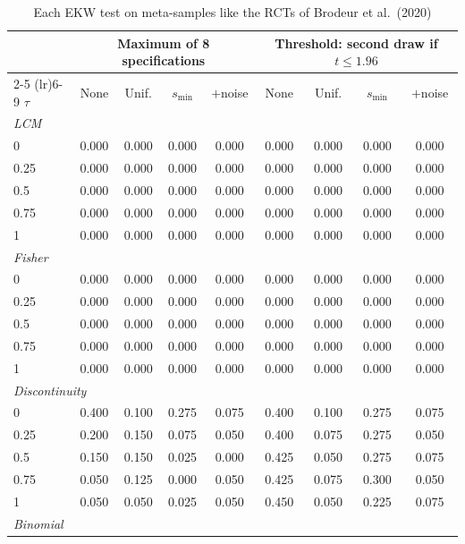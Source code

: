 \begin{table}[htbp]
\centering
\caption{Each EKW test on meta-samples like the RCTs of Brodeur et al.\ (2020)}
\label{tab:brodeur_rct_power_EKW}
\footnotesize
\setlength{\tabcolsep}{4pt}
\begin{tabular}{lcccccccc}
\toprule
 & \multicolumn{4}{c}{Maximum of 8 specifications} & \multicolumn{4}{c}{Threshold: second draw if $t \le 1.96$} \\
\cmidrule(lr){2-5} \cmidrule(lr){6-9}
$\tau$ & None & Unif. & $s_{\min}$ & $+$noise & None & Unif. & $s_{\min}$ & $+$noise \\
\midrule
\multicolumn{9}{l}{\textit{LCM}} \\
0 & 0.000 & 0.000 & 0.000 & 0.000 & 0.000 & 0.000 & 0.000 & 0.000 \\
0.25 & 0.000 & 0.000 & 0.000 & 0.000 & 0.000 & 0.000 & 0.000 & 0.000 \\
0.5 & 0.000 & 0.000 & 0.000 & 0.000 & 0.000 & 0.000 & 0.000 & 0.000 \\
0.75 & 0.000 & 0.000 & 0.000 & 0.000 & 0.000 & 0.000 & 0.000 & 0.000 \\
1 & 0.000 & 0.000 & 0.000 & 0.000 & 0.000 & 0.000 & 0.000 & 0.000 \\
\midrule
\multicolumn{9}{l}{\textit{Fisher}} \\
0 & 0.000 & 0.000 & 0.000 & 0.000 & 0.000 & 0.000 & 0.000 & 0.000 \\
0.25 & 0.000 & 0.000 & 0.000 & 0.000 & 0.000 & 0.000 & 0.000 & 0.000 \\
0.5 & 0.000 & 0.000 & 0.000 & 0.000 & 0.000 & 0.000 & 0.000 & 0.000 \\
0.75 & 0.000 & 0.000 & 0.000 & 0.000 & 0.000 & 0.000 & 0.000 & 0.000 \\
1 & 0.000 & 0.000 & 0.000 & 0.000 & 0.000 & 0.000 & 0.000 & 0.000 \\
\midrule
\multicolumn{9}{l}{\textit{Discontinuity}} \\
0 & 0.400 & 0.100 & 0.275 & 0.075 & 0.400 & 0.100 & 0.275 & 0.075 \\
0.25 & 0.200 & 0.150 & 0.075 & 0.050 & 0.400 & 0.075 & 0.275 & 0.050 \\
0.5 & 0.150 & 0.150 & 0.025 & 0.000 & 0.425 & 0.050 & 0.275 & 0.075 \\
0.75 & 0.050 & 0.125 & 0.000 & 0.050 & 0.425 & 0.075 & 0.300 & 0.050 \\
1 & 0.050 & 0.050 & 0.025 & 0.050 & 0.450 & 0.050 & 0.225 & 0.075 \\
\midrule
\multicolumn{9}{l}{\textit{Binomial}} \\

\end{tabular}
\end{table}
